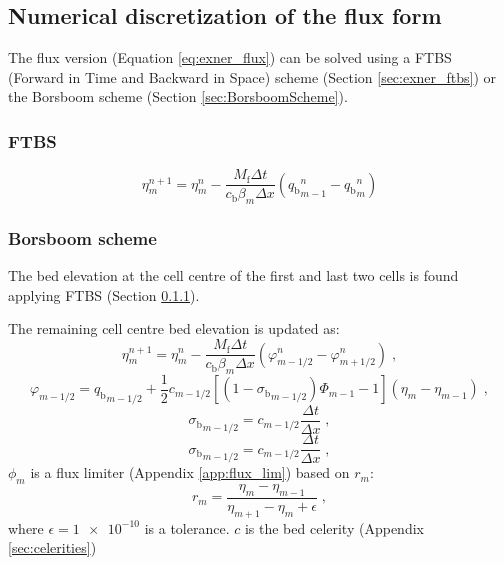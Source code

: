 \documentclass{deltares_report_elv}
\newcommand{\mathsub}[2]{#1_{\mathrm{#2}}}
\begin{document}
\subsection{Numerical discretization of the flux form}
\label{sec:exner_ed}

\newcommand{\BorsboomScheme}{Borsboom scheme}

The flux version (Equation \ref{eq:exner_flux}) can be solved using a FTBS (Forward in Time and Backward in Space) scheme (Section \ref{sec:exner_ftbs}) or the \BorsboomScheme{} (Section \ref{sec:BorsboomScheme}). 

\subsubsection{FTBS}
\label{sec:exner_FTBS}

\begin{equation}
\eta_{m}^{n+1}=\eta_{m}^{n}-\frac{\mathsub{M}{f}\Delta t}{\mathsub{c}{b}\beta_{m}\Delta x}\left(\left.\mathsub{q}{b}\right._{m-1}^{n}-\left.\mathsub{q}{b}\right._{m}^{n}\right)
\end{equation}

\subsubsection{\BorsboomScheme{}}

The bed elevation at the cell centre of the first and last two cells is found applying FTBS (Section \ref{sec:exner_FTBS}). 

The remaining cell centre bed elevation is updated as:
\begin{equation}
\label{eq:exner_borsboom}
\eta_{m}^{n+1}=\eta_{m}^{n}-\frac{\mathsub{M}{f}\Delta t}{\mathsub{c}{b}\beta_{m}\Delta x}\left(\varphi_{m-1/2}^{n}-\varphi_{m+1/2}^{n}\right) \;,
\end{equation}
%
\begin{equation}
\label{eq:phi_borsboom}
\varphi_{m-1/2}=\left.\mathsub{q}{b}\right._{m-1/2}+\frac{1}{2}c_{m-1/2}\left[\left(1-\left.\mathsub{\sigma}{b}\right._{m-1/2}\right)\Phi_{m-1}-1\right]\left(\eta_{m}-\eta_{m-1}\right) \;,
\end{equation}
%
\begin{equation}
\label{eq:sigma_borsboom}
\left.\mathsub{\sigma}{b}\right._{m-1/2}=c_{m-1/2}\frac{\Delta t}{\Delta x} \;,
\end{equation}
%
\begin{equation}
\label{eq:sigma_borsboom}
\left.\mathsub{\sigma}{b}\right._{m-1/2}=c_{m-1/2}\frac{\Delta t}{\Delta x} \;,
\end{equation}
%
$\phi_{m}$ is a flux limiter (Appendix \ref{app:flux_lim}) based on $r_{m}$:
\begin{equation}
\label{eq:r_borsboom}
r_{m}=\frac{\eta_m-\eta_{m-1}}{\eta_{m+1}-\eta_m+\epsilon} \;,
\end{equation}
where $\epsilon=\num{1e-10}$ is a tolerance. 
%
$c$ is the bed celerity (Appendix \ref{sec:celerities})
\end{document}
